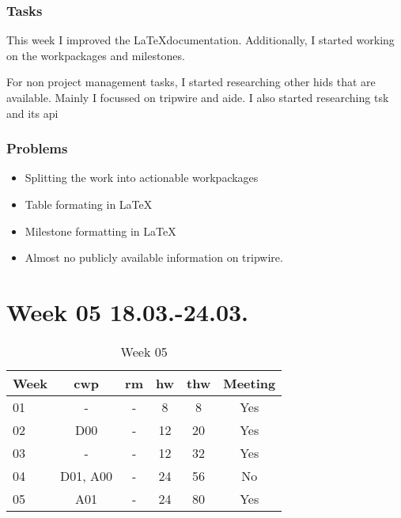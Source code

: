 \subsubsection{Tasks}

This week I improved the \LaTeX documentation. Additionally, I started working on the workpackages and milestones.

For non project management tasks, I started researching other \gls{hids} that are available. Mainly I focussed on \gls{tripwire} and \gls{aide}. I also started researching \gls{tsk} and its \gls{api}

\subsubsection{Problems}

\begin{itemize}
    \item Splitting the work into actionable workpackages
    \item Table formating in \LaTeX
    \item Milestone formatting in \LaTeX
    \item Almost no publicly available information on tripwire.
\end{itemize}

\section{Week 05 18.03.-24.03.}
\label{sec:journal:week05}

\begin{table}[!ht]
    \begin{center}
        \caption{Week 05}
        \label{tab:journal:week05}
        \begin{tabular}{l|c|c|c|c|c}
            \textbf{Week} & \textbf{\gls{cwp}} & \textbf{\gls{rm}} & \textbf{\gls{hw}} & \textbf{\gls{thw}} & \textbf{Meeting}\\
        \hline
        01 & - & - & 8 & 8 & Yes \\
        02 & D00 & - & 12 & 20 & Yes \\
        03 & - & - & 12 & 32 & Yes \\
        04 & D01, A00 & - & 24 & 56 & No \\
        05 & A01 & - & 24 & 80 & Yes \\
        \end{tabular}
    \end{center}
\end{table}

